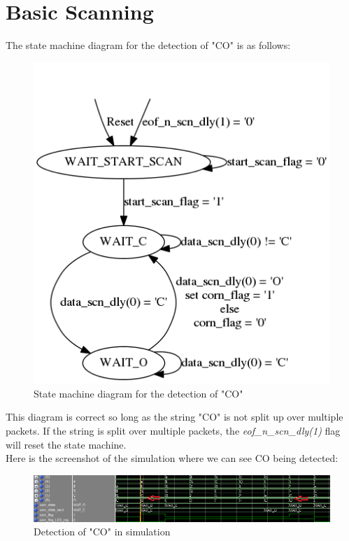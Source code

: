 \documentclass{article}
\begin{document}
\section{Basic Scanning}
The state machine diagram for the detection of "CO" is as follows:

	\begin{figure}[H]
		\begin{center}
			\includegraphics[scale=0.35]{../graphviz/part_2_state_diagram.png}
			\caption{State machine diagram for the detection of "CO"}
		\end{center}
	\end{figure}
	
This diagram is correct so long as the string "CO" is not split up over multiple packets. If the string is split over multiple packets, the \textit{eof\_n\_scn\_dly(1)} flag will reset the state machine. \\

Here is the screenshot of the simulation where we can see CO being detected:
	\begin{figure}[H]
		\begin{center}
			\includegraphics[scale=0.3]{../part2_files/CO_string_detection.png}
			\caption{Detection of "CO" in simulation}
		\end{center}
	\end{figure}
\end{document}
